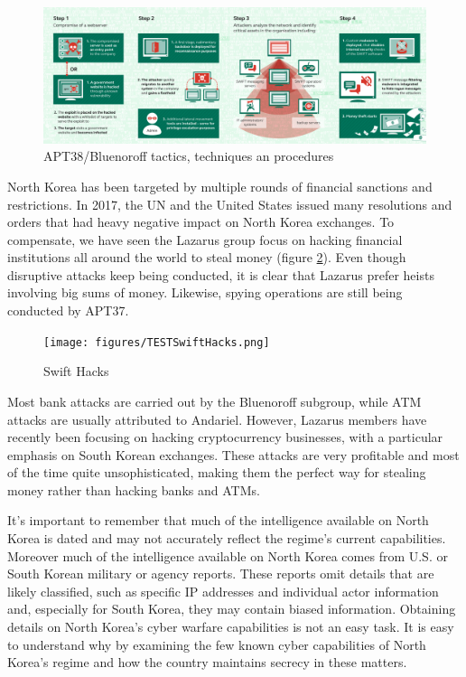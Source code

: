 \documentclass[12pt]{article}
\begin{document}
        \begin{figure}[H]
        \centering
        \includegraphics[width=\textwidth,cfbox=red 0.1mm 0.1mm]{figures/lazarus-tpp.png}
        \caption{APT38/Bluenoroff tactics, techniques an procedures}
        \label{fig:lazarus38}
        \end{figure}

        North Korea has been targeted by multiple rounds of financial sanctions and restrictions. In 2017, the UN and the United States issued many resolutions and orders that had heavy negative impact on North Korea exchanges. 
        To compensate, we have seen the Lazarus group focus on hacking financial institutions all around the world to steal money (figure \ref{fig:SwiftHacks}). Even though disruptive attacks keep being conducted, it is clear that Lazarus prefer heists involving big sums of money. Likewise, spying operations are still being conducted by APT37. 
        
        \begin{figure}[H]
        \centering
        \texttt{[image: figures/TESTSwiftHacks.png]}
        \caption{Swift Hacks}
        \label{fig:SwiftHacks}
        \end{figure}
         
        Most bank attacks are carried out by the Bluenoroff subgroup, while ATM attacks are usually attributed to Andariel. However, Lazarus members have recently been focusing on hacking cryptocurrency businesses, with a particular emphasis on South Korean exchanges. These attacks are very profitable and most of the time quite unsophisticated, making them the perfect way for stealing money rather than hacking banks and ATMs. 
        
        It's important to remember that much of the intelligence available on North Korea is dated and may not accurately reflect the regime’s current capabilities. Moreover much of the intelligence available on North Korea comes from U.S. or South Korean military or agency reports. These reports omit details that are likely classified, such as specific IP addresses and individual actor information and, especially for South Korea, they may contain biased information. Obtaining details on North Korea’s cyber warfare capabilities is not an easy task. It is easy to understand why by examining the few known cyber capabilities of North Korea’s regime and how the country maintains secrecy in these matters. 
        
\end{document}
